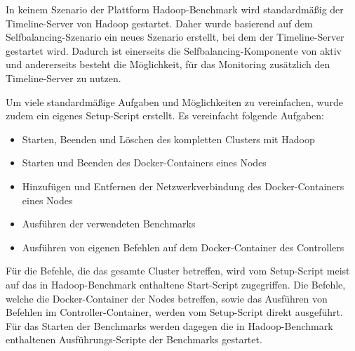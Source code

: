 In keinem Szenario der Plattform Hadoop-Benchmark wird standardmäßig der Timeline-Server von Hadoop gestartet. Daher wurde basierend auf dem Selfbalancing-Szenario ein neues Szenario erstellt, bei dem der Timeline-Server gestartet wird. Dadurch ist einerseits die Selfbalancing-Komponente von \citeauthor{zhang2016} aktiv und andererseits besteht die Möglichkeit, für das Monitoring zusätzlich den Timeline-Server zu nutzen.

Um viele standardmäßige Aufgaben und Möglichkeiten zu vereinfachen, wurde zudem ein eigenes Setup-Script erstellt. Es vereinfacht folgende Aufgaben:

\begin{itemize}[noitemsep]
    \item Starten, Beenden und Löschen des kompletten Clusters mit Hadoop
    \item Starten und Beenden des Docker-Containers eines Nodes
    \item Hinzufügen und Entfernen der Netzwerkverbindung des Docker-Containers eines Nodes
    \item Ausführen der verwendeten Benchmarks
    \item Ausführen von eigenen Befehlen auf dem Docker-Container des Controllers
\end{itemize}

Für die Befehle, die das gesamte Cluster betreffen, wird vom Setup-Script meist auf das in Hadoop-Benchmark enthaltene Start-Script zugegriffen. Die Befehle, welche die Docker-Container der Nodes betreffen, sowie das Ausführen von Befehlen im Controller-Container, werden vom Setup-Script direkt ausgeführt. Für das Starten der Benchmarks werden dagegen die in Hadoop-Benchmark enthaltenen Ausführungs-Scripte der Benchmarks gestartet.
